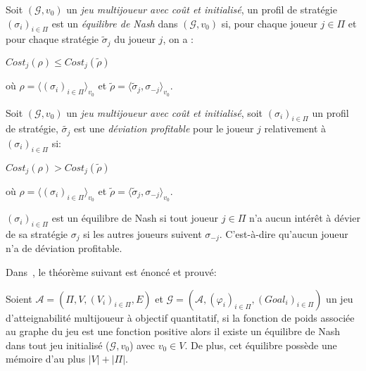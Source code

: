 



\begin{defi}
	
	Soit $(\mathcal{G}, v_{0})$ un \textit{jeu multijoueur avec coût et initialisé}, un profil de stratégie $(\sigma _{i})_{i \in \Pi}$ est un \textit{équilibre de Nash} dans $(\mathcal{G}, v_{0})$ si, pour chaque joueur $j \in \Pi$ et pour chaque stratégie $\tilde{\sigma}_{j}$ du joueur $j$, on a :
	\begin{center}$ Cost_{j}(\rho) \leq Cost_{j}(\tilde{\rho})$ \end{center}
	où $\rho = \langle (\sigma _{i})_{i \in \Pi}\rangle_{v_0}$ et $\tilde{\rho} = \langle \tilde{\sigma} _{j} ,\sigma _{-j}\rangle_{v_0}$.
\end{defi}	



\begin{defi}
	
	Soit $(\mathcal{G}, v_{0})$ un \textit{jeu multijoueur avec coût et initialisé}, soit $(\sigma _{i})_{i \in \Pi}$ un profil de stratégie, $\tilde{\sigma _{j}}$ est une \textit{déviation profitable} pour le joueur $j$ relativement à $(\sigma _{i})_{i \in \Pi}$ si:
	\begin{center} $ Cost_{j}(\rho) > Cost_{j}(\tilde{\rho})$ \end{center}
	où $\rho = \langle (\sigma _{i})_{i \in \Pi} \rangle_{v_0}$ et $\tilde{\rho} = \langle \tilde{\sigma} _{j} ,\sigma _{-j} \rangle_{v_0}$. 
\end{defi}

\begin{rem}
	$(\sigma _{i})_{i\in \Pi}$ est un équilibre de Nash si tout joueur $j \in \Pi$ n'a aucun intérêt à dévier de sa stratégie $\sigma _{j}$ si les autres joueurs suivent $\sigma _{-j}$. C'est-à-dire qu'aucun joueur n'a de déviation profitable. 
\end{rem}





 Dans~\cite{DBLP:conf/lfcs/BrihayePS13}, le théorème suivant est énoncé et prouvé:

\begin{thm}
	Soient $\mathcal{A} = (\Pi, V, (V_{i})_{i \in \Pi}, E)$ et $\mathcal{G} = (\mathcal{A},(\varphi _{i})_{i \in \Pi}, (Goal_{i})_{i \in \Pi})$ un jeu d'atteignabilité multijoueur à objectif quantitatif, si la fonction de poids associée au graphe du jeu est une fonction positive alors il existe un équilibre de Nash dans tout jeu initialisé ($\mathcal{G},v_{0}$) avec $v_{0}\in V$. De plus, cet équilibre possède une mémoire d'au plus $|V| + |\Pi|$.
\end{thm}

